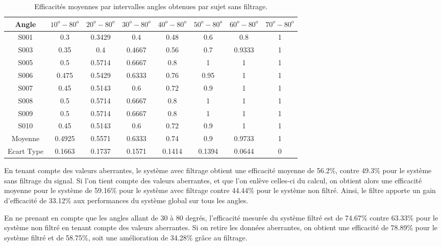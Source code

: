 \documentclass[letterpaper, twoside, 12pt, memoire, creativecommons, hyperref]{thETS}
\begin{document}
\begin{table}[ht]
	\caption{Efficacités moyennes par intervalles angles obtenues par sujet sans filtrage. }
		\begin{tabular}{|c|c|c|c|c|c|c|c|}
		\hline
			Angle & $10^{o}-80^{o}$ & $20^{o}-80^{o}$ & $30^{o}-80^{o}$ & $40^{o}-80^{o}$ & $50^{o}-80^{o}$ & $60^{o}-80^{o}$ & $70^{o}-80^{o}$ \\
	    \hline
	    		S001 & 0.3 & 0.3429 & 0.4 & 0.48 & 0.6 & 0.8 & 1\\
	    \hline
	    		S003 & 0.35 & 0.4 & 0.4667 & 0.56 & 0.7 & 0.9333 & 1\\
	    \hline
	    		S005 & 0.5 & 0.5714 & 0.6667 & 0.8 & 1 & 1 & 1\\
	    \hline
	    		S006 & 0.475 & 0.5429 & 0.6333 & 0.76 & 0.95 & 1 & 1\\
	    \hline
	    		S007 & 0.45 & 0.5143 & 0.6 & 0.72 & 0.9 & 1 & 1\\
	    \hline
	    		S008 & 0.5 & 0.5714 & 0.6667 & 0.8 & 1 & 1 & 1\\
	    \hline
	    		S009 & 0.5 & 0.5714 & 0.6667 & 0.8 & 1 & 1 & 1\\
	    \hline
	    		S010 & 0.45 & 0.5143 & 0.6 & 0.72 & 0.9 & 1 & 1\\
	    \hline
	    		Moyenne  & 0.4925 & 0.5571 & 0.6333 & 0.74 & 0.9 & 0.9733 & 1\\
	    \hline
	    		Ecart Type & 0.1663 & 0.1737 & 0.1571 & 0.1414 & 0.1394 & 0.0644 & 0\\
	    \hline
		\end{tabular}
	\label{tab:effFinterval}
\end{table}

En tenant compte des valeurs aberrantes, le système avec filtrage obtient une efficacité moyenne de 56.2\%, contre 49.3\% pour le système sans filtrage du signal. Si l'on tient compte des valeurs aberrantes, et que l'on enlève celles-ci du calcul, on obtient alors une efficacité moyenne pour le système de 59.16\% pour le système avec filtrage contre 44.44\% pour le système non filtré. Ainsi, le filtre apporte un gain d'efficacité de 33.12\% aux performances du système global sur tous les angles.

En ne prenant en compte que les angles allant de 30 à 80 degrés, l'efficacité mesurée du système filtré est de 74.67\% contre 63.33\% pour le système non filtré en tenant compte des valeurs aberrantes. Si on retire les données aberrantes, on obtient une efficacité de 78.89\% pour le système filtré et de 58.75\%, soit une amélioration de 34.28\% grâce au filtrage.
\end{document}
